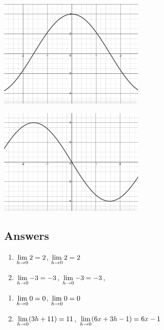\begin{center}
\begin{multicols}{2}
\includegraphics[width=2.75in]{./IntroductiontoDerivativesGraphics/MatchFunc05.jpeg}

\includegraphics[width=2.75in]{./IntroductiontoDerivativesGraphics/MatchDeriv05.jpeg}

\end{multicols}

\end{center}


\newpage


\subsection{Answers}


\begin{enumerate}

\item $\displaystyle{\lim_{h \rightarrow 0} 2 = 2}$, $\displaystyle{\lim_{h \rightarrow 0} 2 = 2}$
\item $\displaystyle{\lim_{h \rightarrow 0} -3 = -3}$, $\displaystyle{\lim_{h \rightarrow 0} -3 = -3}$,

\setcounter{HW}{\value{enumi}}
\end{enumerate}

\begin{enumerate}
\setcounter{enumi}{\value{HW}}

\item $\displaystyle{\lim_{h \rightarrow 0} 0 = 0}$,  $\displaystyle{\lim_{h \rightarrow 0} 0 = 0}$
\item  $\displaystyle{\lim_{h \rightarrow 0} (3h+11)= 11}$,   $\displaystyle{\lim_{h \rightarrow 0} (6x+3h-1)= 6x-1}$

\setcounter{HW}{\value{enumi}}
\end{enumerate}

